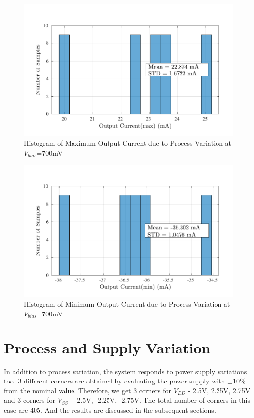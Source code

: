 \begin{figure} [H]
\centering
\includegraphics[scale=1]{Figures/Corners/Overall/Proc_Max/PDFs/Proc_Max_imax.pdf}
\caption{Histogram of Maximum Output Current due to Process Variation at $V_{bias}$=700mV}
\end{figure}

\begin{figure} [H]
\centering
\includegraphics[scale=1]{Figures/Corners/Overall/Proc_Max/PDFs/Proc_Max_imin.pdf}
\caption{Histogram of Minimum Output Current due to Process Variation at $V_{bias}$=700mV}
\end{figure}

\section{Process and Supply Variation}

In addition to process variation, the system responds to power supply variations too. 3 different corners are obtained by evaluating the power supply with $\pm$10\% from the nominal value. Therefore, we get 3 corners for $V_{DD}$ - 2.5V, 2.25V, 2.75V and 3 corners for $V_{SS}$ - -2.5V, -2.25V, -2.75V. The total number of corners in this case are 405. And the results are discussed in the subsequent sections.

